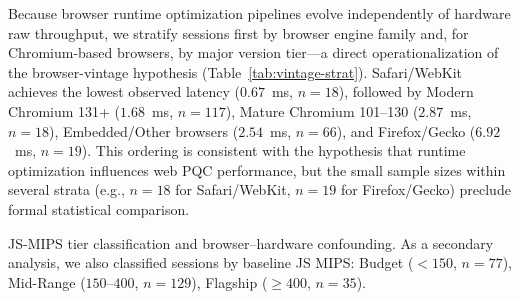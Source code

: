 \documentclass[11pt,a4paper]{article}
\def\textbf#1{#1}%
\begin{document}
Because browser runtime optimization pipelines evolve independently of hardware raw throughput, we stratify sessions first by browser engine family and, for Chromium-based browsers, by major version tier---a direct operationalization of the browser-vintage hypothesis (Table~\ref{tab:vintage-strat}). Safari/WebKit achieves the lowest observed latency ($0.67$~ms, $n=18$), followed by Modern Chromium 131+ ($1.68$~ms, $n=117$), Mature Chromium 101--130 ($2.87$~ms, $n=18$), Embedded/Other browsers ($2.54$~ms, $n=66$), and Firefox/Gecko ($6.92$~ms, $n=19$). This ordering is consistent with the hypothesis that runtime optimization influences web PQC performance, but the small sample sizes within several strata (e.g., $n=18$ for Safari/WebKit, $n=19$ for Firefox/Gecko) preclude formal statistical comparison.

\textbf{JS-MIPS tier classification and browser--hardware confounding.} As a secondary analysis, we also classified sessions by baseline JS MIPS: Budget ($<150$, $n=77$), Mid-Range ($150$--$400$, $n=129$), Flagship ($\geq400$, $n=35$).
\end{document}
